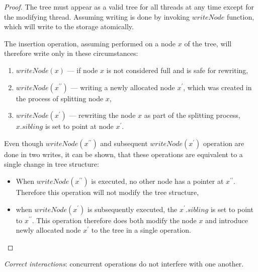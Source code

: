 \begin{proof}
  The tree must appear as a valid tree for all threads at any time except for the modifying thread. Assuming writing is done by invoking $\mathit{writeNode}$ function, which will write to the storage atomically.

  The insertion operation, assuming performed on a node $x$ of the tree, will therefore write only in these circumstances:

  \begin{enumerate}
    \item $\mathit{writeNode}(x)$ --- if node $x$ is not considered full and is safe for rewriting,
    \item $\mathit{writeNode}(x^{\prime\prime})$ --- writing a newly allocated node $x^\prime$, which was created in the process of splitting node $x$,
    \item $\mathit{writeNode}(x^{\prime})$ --- rewriting the node $x$ as part of the splitting process, $x.\mathit{sibling}$ is set to point at node $x^\prime$.
  \end{enumerate}

  Even though $\mathit{writeNode}(x^{\prime\prime})$ and subsequent $\mathit{writeNode}(x^\prime)$ operation are done in two writes, it can be shown, that these operations are equivalent to a single change in tree structure:

  \begin{itemize}
    \item When $\mathit{writeNode}(x^{\prime\prime})$ is executed, no other node has a pointer at $x^{\prime\prime}$. Therefore this operation will not modify the tree structure,
    \item when $\mathit{writeNode}(x^\prime)$ is subsequently executed, the $x^\prime.\mathit{sibling}$ is set to point to $x^{\prime\prime}$. This operation therefore does both modify the node $x$ and introduce newly allocated node $x^\prime$ to the tree in a single operation.
  \end{itemize}
\end{proof}

\begin{theorem}
  \textit{Correct interactions}: concurrent operations do not interfere with one another.
\end{theorem}

